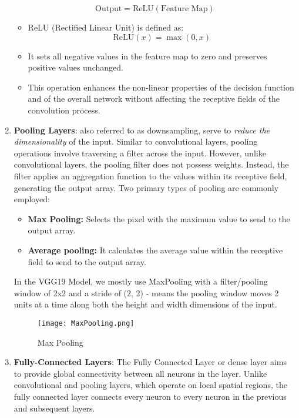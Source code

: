 \documentclass[12pt]{article}
\begin{document}
\begin{enumerate}
        \[\text{Output} = \text{ReLU}(\text{Feature Map})\]

        \begin{itemize}
            \item ReLU (Rectified Linear Unit) is defined as:
            \[\text{ReLU}(x) = \max(0, x)\]   
            \item It sets all negative values in the feature map to zero and preserves positive values unchanged.
            \item This operation enhances the non-linear properties of the decision function and of the overall network without affecting the receptive fields of the convolution process.
        \end{itemize}

        \item \textbf{Pooling Layers}: also referred to as downsampling, serve to \textit{reduce the dimensionality} of the input. Similar to convolutional layers, pooling operations involve traversing a filter across the input. However, unlike convolutional layers, the pooling filter does not possess weights. Instead, the filter applies an aggregation function to the values within its receptive field, generating the output array. Two primary types of pooling are commonly employed:
        \begin{itemize}
            \item \textbf{Max Pooling:} Selects the pixel with the maximum value to send to the output array.
            \item \textbf{Average pooling:} It calculates the average value within the receptive field to send to the output array.
        \end{itemize}

        In the VGG19 Model, we mostly use MaxPooling with a filter/pooling window of 2x2 and a stride of (2, 2) - means the pooling window moves 2 units at a time along both the height 
        and width dimensions of the input.

        \begin{figure}[h]
        \centering
        \texttt{[image: MaxPooling.png]}
        \caption{Max Pooling}
        \end{figure}
        
        \item \textbf{Fully-Connected Layers}: The Fully Connected Layer or dense layer aims to provide global connectivity between all neurons in the layer. Unlike convolutional and pooling layers, which operate on local spatial regions, the fully connected layer connects every neuron to every neuron in the previous and subsequent layers. 


\end{enumerate}
\end{document}
